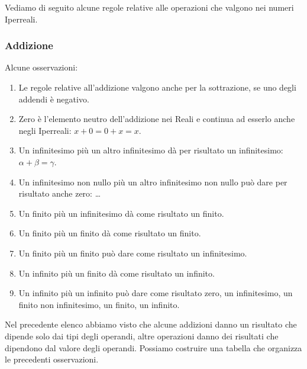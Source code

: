 Vediamo di seguito alcune regole relative alle operazioni 
che valgono nei numeri Iperreali.

\subsubsection{Addizione}
\label{subsec:insnum_addizione}

Alcune osservazioni:

\begin{enumerate} [noitemsep]
 \item Le regole relative all'addizione valgono anche per la sottrazione, se 
uno degli addendi è negativo. 
 \item Zero è l'elemento neutro dell'addizione nei Reali e continua ad 
esserlo 
anche negli Iperreali: $x+0=0+x=x$.
 \item Un infinitesimo più un altro infinitesimo dà per risultato un 
infinitesimo: $\alpha+\beta=\gamma$.
 \item Un infinitesimo non nullo più un altro infinitesimo non nullo può dare 
per risultato anche zero: \dots
 \item Un finito più un infinitesimo dà come risultato un finito.
 \item Un finito più un finito dà come risultato un finito.
 \item Un finito più un finito può dare come risultato un infinitesimo.
 \item Un infinito più un finito dà come risultato un infinito.
 \item Un infinito più un infinito può dare come risultato zero, un 
infinitesimo, un finito non infinitesimo, un finito, un infinito.
\end{enumerate}

Nel precedente elenco abbiamo visto che alcune addizioni danno un risultato 
che dipende solo dai tipi degli operandi, altre operazioni danno dei 
risultati 
che dipendono dal valore degli operandi. Possiamo costruire una tabella che 
organizza le precedenti osservazioni.

\begin{center}
\renewcommand{\arraystretch}{.0}
\end{center}

